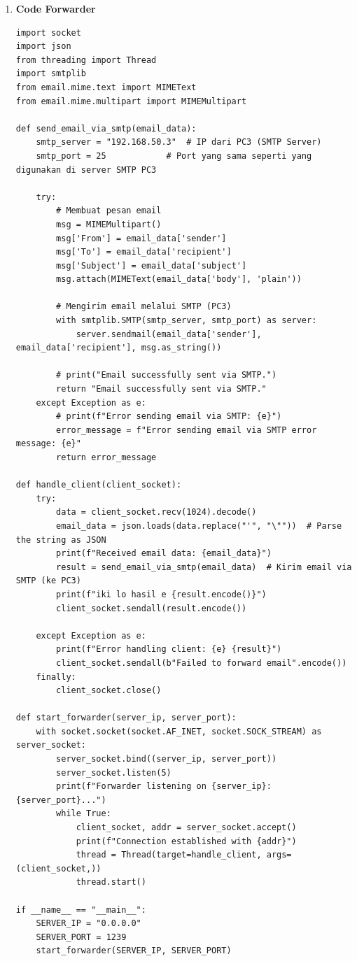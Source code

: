 \documentclass[12pt, a4paper]{article}
\begin{document}
\begin{enumerate}
 \item \textbf{Code Forwarder}
 \begin{verbatim}
import socket
import json
from threading import Thread
import smtplib
from email.mime.text import MIMEText
from email.mime.multipart import MIMEMultipart

def send_email_via_smtp(email_data):
    smtp_server = "192.168.50.3"  # IP dari PC3 (SMTP Server)
    smtp_port = 25            # Port yang sama seperti yang digunakan di server SMTP PC3

    try:
        # Membuat pesan email
        msg = MIMEMultipart()
        msg['From'] = email_data['sender']
        msg['To'] = email_data['recipient']
        msg['Subject'] = email_data['subject']
        msg.attach(MIMEText(email_data['body'], 'plain'))

        # Mengirim email melalui SMTP (PC3)
        with smtplib.SMTP(smtp_server, smtp_port) as server:
            server.sendmail(email_data['sender'], email_data['recipient'], msg.as_string())

        # print("Email successfully sent via SMTP.")
        return "Email successfully sent via SMTP."
    except Exception as e:
        # print(f"Error sending email via SMTP: {e}")
        error_message = f"Error sending email via SMTP error message: {e}"
        return error_message

def handle_client(client_socket):
    try:
        data = client_socket.recv(1024).decode()
        email_data = json.loads(data.replace("'", "\""))  # Parse the string as JSON
        print(f"Received email data: {email_data}")
        result = send_email_via_smtp(email_data)  # Kirim email via SMTP (ke PC3)
        print(f"iki lo hasil e {result.encode()}")
        client_socket.sendall(result.encode())

    except Exception as e:
        print(f"Error handling client: {e} {result}")
        client_socket.sendall(b"Failed to forward email".encode())
    finally:
        client_socket.close()

def start_forwarder(server_ip, server_port):
    with socket.socket(socket.AF_INET, socket.SOCK_STREAM) as server_socket:
        server_socket.bind((server_ip, server_port))
        server_socket.listen(5)
        print(f"Forwarder listening on {server_ip}:{server_port}...")
        while True:
            client_socket, addr = server_socket.accept()
            print(f"Connection established with {addr}")
            thread = Thread(target=handle_client, args=(client_socket,))
            thread.start()

if __name__ == "__main__":
    SERVER_IP = "0.0.0.0"
    SERVER_PORT = 1239
    start_forwarder(SERVER_IP, SERVER_PORT)
 \end{verbatim}
\end{enumerate}
\end{document}
